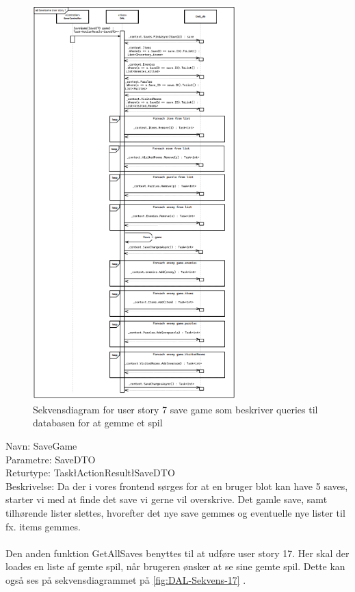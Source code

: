 \begin{figure}[H]
\centering
\includegraphics[width = 0.7\textwidth]{02-Body/Images/DAL-Database/SaveSd.PNG}
\caption{Sekvensdiagram for user story 7 save game som beskriver queries til databasen for at gemme et spil}
\label{fig:DAL-Sekvens-7}
\end{figure}


Navn: SaveGame\\
Parametre: SaveDTO\\
Returtype: Task\l ActionResult\l SaveDTO\g\g \\
Beskrivelse: Da der i vores frontend sørges for at en bruger blot kan have 5 saves, starter vi med at finde det save vi gerne vil overskrive. Det gamle save, samt tilhørende lister slettes, hvorefter det nye save gemmes og eventuelle nye lister til fx. items gemmes.\\\\

Den anden funktion GetAllSaves benyttes til at udføre user story 17.
Her skal der loades en liste af gemte spil, når brugeren ønsker at se sine gemte spil. Dette kan også ses på sekvensdiagrammet på \autoref{fig:DAL-Sekvens-17} .\\\\

